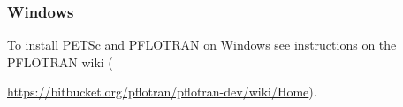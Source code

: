 \subsubsection{Windows}

To install PETSc and PFLOTRAN on Windows see instructions on the PFLOTRAN wiki \linebreak ({\url{https://bitbucket.org/pflotran/pflotran-dev/wiki/Home}).

}
